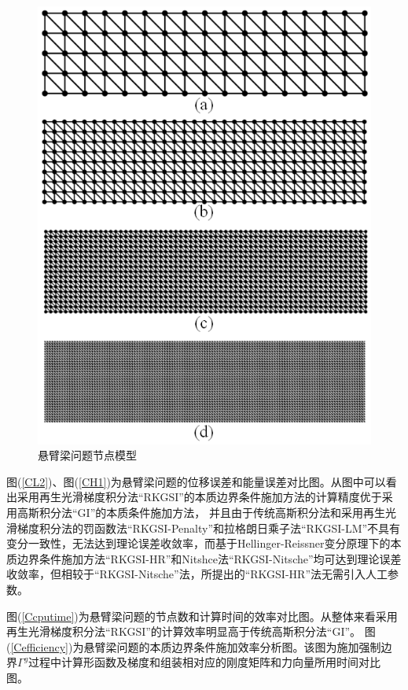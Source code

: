 \begin{figure}[H]
    \centering
    \includegraphics[scale=0.7]{figure/EHR/cantilever/cantilever.mesh.png}
    \caption{悬臂梁问题节点模型}\label{cantilever.mesh}
\end{figure}
图(\ref{CL2})、图(\ref{CH1})为悬臂梁问题的位移误差和能量误差对比图。从图中可以看出采用再生光滑梯度积分法“RKGSI”的本质边界条件施加方法的计算精度优于采用高斯积分法“GI”的本质条件施加方法，
并且由于传统高斯积分法和采用再生光滑梯度积分法的罚函数法“RKGSI-Penalty”和拉格朗日乘子法“RKGSI-LM”不具有变分一致性，无法达到理论误差收敛率，而基于Hellinger-Reissner变分原理下的本质边界条件施加方法“RKGSI-HR”和Nitshce法“RKGSI-Nitsche”均可达到理论误差收敛率，但相较于“RKGSI-Nitsche”法，所提出的“RKGSI-HR”法无需引入人工参数。\par
图(\ref{Ccputime})为悬臂梁问题的节点数和计算时间的效率对比图。从整体来看采用再生光滑梯度积分法“RKGSI”的计算效率明显高于传统高斯积分法“GI”。
图(\ref{Cefficiency})为悬臂梁问题的本质边界条件施加效率分析图。该图为施加强制边界$\Gamma^g$过程中计算形函数及梯度和组装相对应的刚度矩阵和力向量所用时间对比图。
